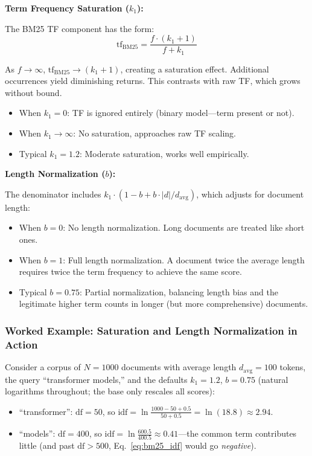 \textbf{Term Frequency Saturation ($k_1$):}

The BM25 TF component has the form:
\begin{equation}
    \text{tf}_{\text{BM25}} = \frac{f \cdot (k_1 + 1)}{f + k_1}
    \label{eq:bm25_tf}
\end{equation}

As $f \to \infty$, $\text{tf}_{\text{BM25}} \to (k_1 + 1)$, creating a saturation
effect. Additional occurrences yield diminishing returns. This contrasts with raw TF,
which grows without bound.

\begin{itemize}
    \item When $k_1 = 0$: TF is ignored entirely (binary model---term present or not).
    \item When $k_1 \to \infty$: No saturation, approaches raw TF scaling.
    \item Typical $k_1 = 1.2$: Moderate saturation, works well empirically.
\end{itemize}

\textbf{Length Normalization ($b$):}

The denominator includes $k_1 \cdot (1 - b + b \cdot |d| / d_{\text{avg}})$, which
adjusts for document length:

\begin{itemize}
    \item When $b = 0$: No length normalization. Long documents are treated like short
    ones.
    \item When $b = 1$: Full length normalization. A document twice the average length
    requires twice the term frequency to achieve the same score.
    \item Typical $b = 0.75$: Partial normalization, balancing length bias and the
    legitimate higher term counts in longer (but more comprehensive) documents.
\end{itemize}

\subsubsection{Worked Example: Saturation and Length Normalization in Action}

Consider a corpus of $N = 1000$ documents with average length $d_{\text{avg}} = 100$
tokens, the query ``transformer models,'' and the defaults $k_1 = 1.2$, $b = 0.75$
(natural logarithms throughout; the base only rescales all scores):

\begin{itemize}
    \item ``transformer'': $\text{df} = 50$, so
          $\text{idf} = \ln\frac{1000 - 50 + 0.5}{50 + 0.5} = \ln(18.8) \approx 2.94$.
    \item ``models'': $\text{df} = 400$, so
          $\text{idf} = \ln\frac{600.5}{400.5} \approx 0.41$---the common term
          contributes little (and past $\text{df} > 500$, Eq.~\eqref{eq:bm25_idf}
          would go \emph{negative}).
\end{itemize}

